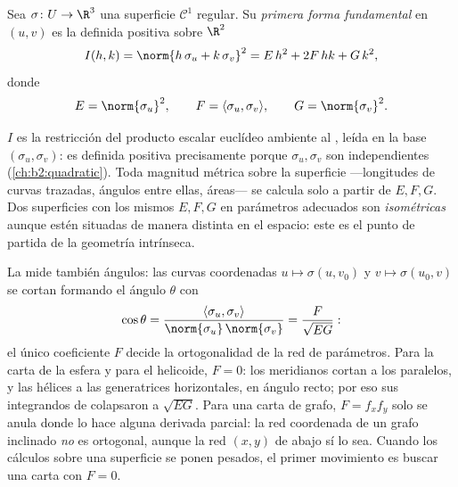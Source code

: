 \begin{definition}\label{def:b2:surfaces:fff}
Sea $\sigma \colon U \to \R^3$ una superficie $\mathcal{C}^1$
regular. Su \emph{primera forma fundamental} en $(u,v)$ es la  definida positiva
sobre $\R^2$
\[
I(h, k) = \norm{h\,\sigma_u + k\,\sigma_v}^2
= E\,h^2 + 2F\,hk + G\,k^2,
\]
donde
\[
E = \norm{\sigma_u}^2,
\qquad
F = \langle \sigma_u, \sigma_v\rangle,
\qquad
G = \norm{\sigma_v}^2 .
\]
\end{definition}

\begin{remark}
$I$ es la restricción del producto escalar euclídeo ambiente al
, leída en la base $(\sigma_u, \sigma_v)$: es definida
positiva precisamente porque $\sigma_u, \sigma_v$ son independientes
(\cref{ch:b2:quadratic}). Toda magnitud métrica sobre la superficie
---longitudes de curvas trazadas, ángulos entre ellas, áreas--- se
calcula solo a partir de $E, F, G$. Dos superficies con los mismos
$E, F, G$ en parámetros adecuados son \emph{isométricas} aunque estén
situadas de manera distinta en el espacio: este es el punto de
partida de la geometría intrínseca.
\end{remark}

\begin{example}\label{ex:b2:surfaces:coordangle}
La  mide también ángulos: las curvas
coordenadas $u \mapsto \sigma(u, v_0)$ y $v \mapsto \sigma(u_0, v)$
se cortan formando el ángulo $\theta$ con
\[
\cos\theta = \frac{\langle\sigma_u,
\sigma_v\rangle}{\norm{\sigma_u}\,\norm{\sigma_v}}
= \frac{F}{\sqrt{EG}} :
\]
el único coeficiente $F$ decide la ortogonalidad de la red de
parámetros. Para la carta de la esfera y para el helicoide, $F = 0$:
los meridianos cortan a los paralelos, y las hélices a las
generatrices horizontales, en ángulo recto; por eso sus integrandos
de  colapsaron a $\sqrt{EG}$. Para una carta de grafo, $F =
f_xf_y$ solo se anula donde lo hace alguna derivada parcial: la red
coordenada de un grafo inclinado \emph{no} es ortogonal, aunque la
red $(x, y)$ de abajo sí lo sea. Cuando los cálculos sobre una
superficie se ponen pesados, el primer movimiento es buscar una carta
con $F = 0$.
\end{example}

